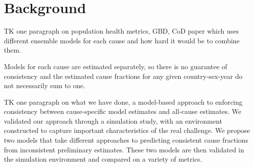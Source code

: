 

\section*{Background}
  TK one paragraph on population health metrics, GBD, CoD paper which
  uses different ensemble models for each cause and how hard it would
  be to combine them.

  Models for each cause are estimated separately, so there is no
  guarantee of consistency and the estimated cause fractions for any
  given country-sex-year do not necessarily sum to one.

  TK one paragraph on what we have done, a model-based approach to
  enforcing consistency between cause-specific model estimates and
  all-cause estimates.  We validated our approach through a simulation
  study, with an environment constructed to capture important
  characteristics of the real challenge.  We propose two models
  that take different approaches to predicting consistent cause
  fractions from inconsistent preliminary estimates.  These two models
  are then validated in the simulation environment and compared on a
  variety of metrics.

